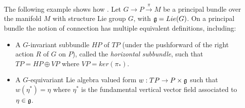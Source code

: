 \begin{example}\label{exampleOrdinaryConnectionIsPrincipalBundleConnection}
The following example shows how . Let $G \to P \xrightarrow{\pi} M$ be a principal bundle over the manifold $M$ with structure Lie group $G$, with $\mathfrak{g} = Lie(G)$. On a principal bundle the notion of connection has multiple equivalent definitions, including:
    \begin{itemize}
    
    \item A $G$-invariant subbundle $HP$ of $TP$ (under the pushforward of the right action $R$ of $G$ on $P$), called the \textit{horizontal subbundle}, such that $TP = HP \oplus VP$ where $VP = ker(\pi_*)$. 
    
    \item A $G$-equivariant Lie algebra valued form $w: TP \to P \times \mathfrak{g}$ such that $w(\eta^*) = \eta$ where $\eta^*$ is the fundamental vertical vector field associated to $\eta \in \mathfrak{g}$.
    

\end{itemize}
\end{example}
